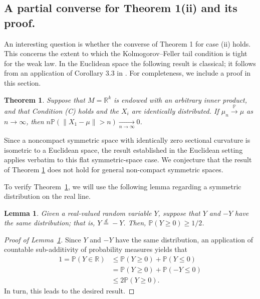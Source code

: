 \documentclass[preprint]{imsart}
\theoremstyle{plain}
\newtheorem{theorem}{Theorem}
\newtheorem{lemma}{Lemma}
\theoremstyle{remark}
\begin{document}
\begin{appendix}
\section{A partial converse for Theorem 1(ii) and its proof.}
 

An interesting question is whether the converse of Theorem 1 for case (ii) holds. This concerns the extent to which the Kolmogorov--Feller tail condition is tight for the weak law. In the Euclidean space the following result is classical; it follows from
an application of Corollary 3.3 in \cite{marcus1979stable}. 
For completeness, we include a proof in this section. 

\begin{theorem}\label{thm:main2}
 Suppose that $M=\mathbb{R}^k$ is endowed with an arbitrary inner product, and that Condition (C) holds and the $X_i$ are identically distributed. If $\mu_n \overset{\mathbb{P}}{\to} \mu$ as $n \to \infty$, then $n\mathbb{P}(\|X_1-\mu\| > n) \underset{n \to \infty}{\to} 0$.
\end{theorem}
Since a noncompact symmetric space with identically zero sectional curvature is isometric to a Euclidean space, the result established in the Euclidean setting applies verbatim to this flat symmetric-space case. 
We conjecture that the result of Theorem \ref{thm:main2} does not hold for general non-compact symmetric spaces.

To verify Theorem~\ref{thm:main2}, we will use the following lemma regarding a symmetric distribution on the real line. 
\begin{lemma}\label{lem:same_dist}
Given a real-valued random variable $Y$, suppose that $Y$ and $-Y$ have the same distribution; that is, $Y\overset{d}{=}-Y$. Then, $\mathbb{P}(Y\ge 0) \ge 1/2$. 
\end{lemma}

\begin{proof}[Proof of Lemma~\ref{lem:same_dist}]
Since $Y$ and $-Y$ have the same distribution, an application of countable sub-additivity of probability measures yields that 
\begin{align*}
1=\mathbb{P}(Y\in \mathbb{R}) &\le \mathbb{P}(Y \ge 0) + \mathbb{P}(Y\le 0) \\
&= \mathbb{P}(Y \ge 0) + \mathbb{P}(-Y\le 0) \\
&\le 2\mathbb{P}(Y\ge 0).
\end{align*}
In turn, this leads to the desired result.
\end{proof} 
 



\end{appendix}
\end{document}
